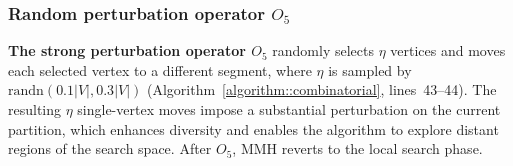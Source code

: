 \documentclass[12pt, a4paper]{article}%
\newcommand{\randn}{\ensuremath{\mathrm{randn}}}
\newcommand{\labeling}{\ensuremath{\mathrm{lab}}}
\numberwithin{equation}{section}
\theoremstyle{plain}
\begin{document}
			
			
			
			\subsubsection{Random perturbation operator $O_5$}
			\label{sec::perturb}

            {\textbf{The strong perturbation operator $O_5$} randomly selects $\eta$ vertices
and moves each selected vertex to a different segment, where $\eta$ is sampled
by $\randn(0.1|V|,0.3|V|)$ (Algorithm~\ref{algorithm::combinatorial},
lines~43--44). The resulting $\eta$ single-vertex moves impose a substantial
perturbation on the current partition, which enhances diversity and enables the
algorithm to explore distant regions of the search space. After $O_5$, MMH reverts to the local search phase.}
			
			
			
\end{document}
